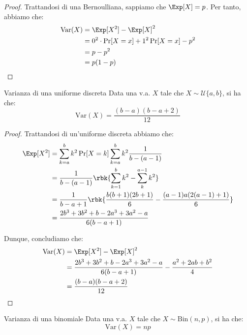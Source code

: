 \documentclass[a4paper, 12pt]{report}
\begin{document}
    \begin{proof}
        Trattandosi di una Bernoulliana, sappiamo che $\Exp[X] = p$. Per tanto, abbiamo che:
        \[\begin{split}
            \mathrm{Var}(X) &= \Exp[X^2] - \Exp[X]^2 \\
            &= 0^2 \cdot \Pr[X = x] + 1^2 \Pr[X=x] - p^2 \\
            &= p-p^2 \\
            &= p(1-p) \\
        \end{split}\]
    \end{proof}

    \begin{framedprop}{Varianza di una uniforme discreta}
        Data una v.a. $X$ tale che $X \sim \mathcal{U}\{a,b\}$, si ha che:
        \[\mathrm{Var}(X) = \frac{(b-a)(b-a+2)}{12}\]
    \end{framedprop}

    \begin{proof}
        Trattandosi di un'uniforme discreta abbiamo che:
        \[\begin{split}
            \Exp[X^2] &= \sum_{k =a}^b k^2 \Pr[X = k]\sum_{k = a}^b k^2 \frac{1}{b-(a-1)} \\
            &= \frac{1}{b-(a-1)} \rbk{\sum_{k = 1}^{b} k^2 - \sum_{k}^{a-1} k^2} \\
            &= \frac{1}{b-a+1} \rbk{\frac{b(b+1)(2b+1)}{6}- \frac{(a-1)a(2(a-1)+1)}{6}}\\
            &= \frac{2b^3+3b^2+b - 2a^3+3a^2-a}{6(b-a+1)} \\
        \end{split}\]

        Dunque, concludiamo che:
        \[\begin{split}
            \mathrm{Var}(X) &= \Exp[X^2] - \Exp[X]^2 \\
            &= \frac{2b^3+3b^2+b - 2a^3+3a^2-a}{6(b-a+1)} - \frac{a^2+2ab+b^2}{4} \\
            &= \frac{(b-a)(b-a+2)}{12}
        \end{split}\]
    \end{proof}
    
    \begin{framedprop}{Varianza di una binomiale}
        Data una v.a. $X$ tale che $X \sim \mathrm{Bin}(n,p)$, si ha che:
        \[\mathrm{Var}(X) = np\]
    \end{framedprop}
\end{document}
